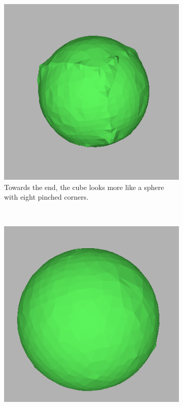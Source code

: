 \begin{figure}
        \begin{subfigure}[t]{0.4\textwidth}
                \includegraphics[width=\textwidth]{img/gl2.png}
                \caption{Towards the end, the cube looks more like a sphere with
                         eight pinched corners.}
                \label{fig:gl2}
        \end{subfigure}%
        ~ %
        \begin{subfigure}[t]{0.4\textwidth}
                \includegraphics[width=\textwidth]{img/gl3.png}

\end{subfigure}
\end{figure}
